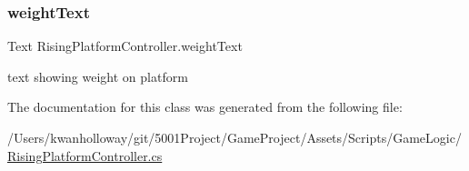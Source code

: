 \subsubsection{\texorpdfstring{weight\+Text}{weightText}}
{\footnotesize\ttfamily Text Rising\+Platform\+Controller.\+weight\+Text}



text showing weight on platform 



The documentation for this class was generated from the following file\+:\begin{DoxyCompactItemize}
\item 
/\+Users/kwanholloway/git/5001\+Project/\+Game\+Project/\+Assets/\+Scripts/\+Game\+Logic/\hyperlink{_rising_platform_controller_8cs}{Rising\+Platform\+Controller.\+cs}\end{DoxyCompactItemize}
